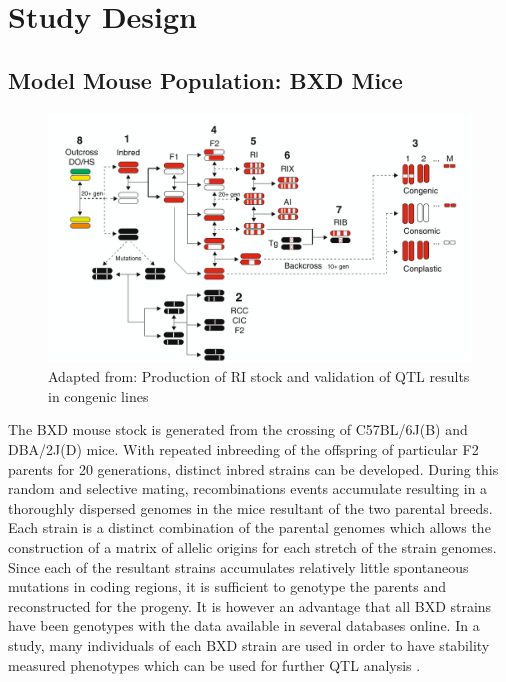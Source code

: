 \documentclass[a4paper,11pt,twoside]{book}
\begin{document}
	\section{Study Design}
	
	\subsection{Model Mouse Population: BXD Mice}
	
	\begin{figure}
		\centering
		\includegraphics[width=\linewidth]{1.Introduction_Figures/BXDs.png}
		\caption{Adapted from:\citep{Williams2017ResourcesGenetics} Production of RI stock and validation of QTL results in congenic lines}
	\end{figure}
	
	The BXD mouse stock is generated from the crossing of C57BL/6J(B) and DBA/2J(D) mice. With repeated inbreeding of the offspring of particular F2 parents for 20 generations, distinct inbred strains can be developed. During this random and selective mating, recombinations events accumulate resulting in a thoroughly dispersed genomes in the mice resultant of the two parental breeds. Each strain is a distinct combination of the parental genomes which allows the construction of a matrix of allelic origins for each stretch of the strain genomes. Since each of the resultant strains accumulates relatively little spontaneous mutations in coding regions, it is sufficient to genotype the parents and reconstructed for the progeny. It is however an advantage that all BXD strains have been genotypes with the data available in several databases online.  In a study, many individuals of each BXD strain are used in order to have stability measured phenotypes which can be used for further QTL analysis \citep{Williams2017ResourcesGenetics}. 
	
\end{document}
